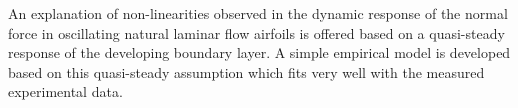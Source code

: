 \begin{paper}

\makepapertitle

%
\begin{paperabstract}
	An explanation of non-linearities observed in the dynamic response of the normal force in oscillating natural laminar flow airfoils is offered based on a quasi-steady response of the developing boundary layer. A simple empirical model is developed based on this quasi-steady assumption which fits very well with the measured experimental data.
\end{paperabstract}


%



%


%


\end{paper}
